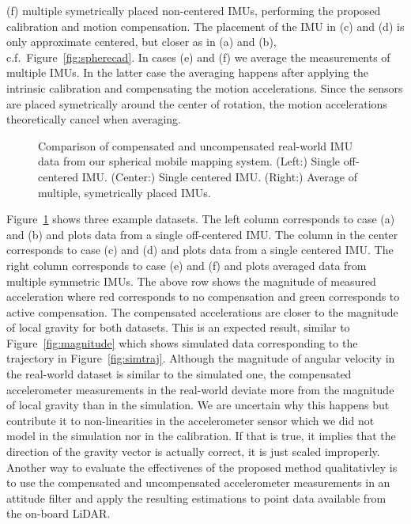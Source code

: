 \documentclass[journal]{IEEEtran}
\begin{document}
(f) multiple symetrically placed non-centered IMUs, performing the proposed calibration and motion compensation.
The placement of the IMU in (c) and (d) is only approximate centered, but closer as in (a) and (b), c.f.~Figure~\ref{fig:spherecad}.
In cases (e) and (f) we average the measurements of multiple IMUs.
In the latter case the averaging happens after applying the intrinsic calibration and compensating the motion accelerations.
Since the sensors are placed symetrically around the center of rotation, the motion accelerations theoretically cancel when averaging.
\begin{figure}
  \centering
  \resizebox{.32\textwidth}{!}{}\hfill
  \resizebox{.32\textwidth}{!}{}\hfill
  \resizebox{.32\textwidth}{!}{}
  \caption{Comparison of compensated and uncompensated real-world IMU data from our spherical mobile mapping system.
  (Left:) Single off-centered IMU.
  (Center:) Single centered IMU.
  (Right:) Average of multiple, symetrically placed IMUs.
  }\label{fig:realdata}
\end{figure}
Figure~\ref{fig:realdata} shows three example datasets.
The left column corresponds to case (a) and (b) and plots data from a single off-centered IMU.
The column in the center corresponds to case (c) and (d) and plots data from a single centered IMU.
The right column corresponds to case (e) and (f) and plots averaged data from multiple symmetric IMUs.
The above row shows the magnitude of measured acceleration where red corresponds to no compensation and green corresponds to active compensation.
The compensated accelerations are closer to the magnitude of local gravity for both datasets.
This is an expected result, similar to Figure~\ref{fig:magnitude} which shows simulated data corresponding to the trajectory in Figure~\ref{fig:simtraj}.
Although the magnitude of angular velocity in the real-world dataset is similar to the simulated one, the compensated accelerometer measurements in the real-world deviate more from the magnitude of local gravity than in the simulation.  
We are uncertain why this happens but contribute it to non-linearities in the accelerometer sensor which we did not model in the simulation nor in the calibration.
If that is true, it implies that the direction of the gravity vector is actually correct, it is just scaled improperly.
Another way to evaluate the effectivenes of the proposed method qualitativley is to use the compensated and uncompensated accelerometer measurements in an attitude filter and apply the resulting estimations to point data available from the on-board LiDAR.
\end{document}
